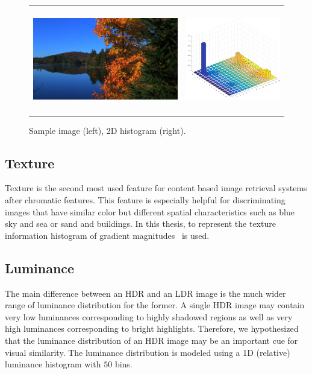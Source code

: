\begin{figure}
\centering
\begin{tabular}{c c}
\includegraphics[height=1.8in]{figures/chapter2/MasonLake.jpg} &
\includegraphics[height=1.8in]{figures/chapter2/57_histab.png}
\end{tabular}
\caption{Sample image (left), 2D histogram (right).}
\label{fig:hists}
\end{figure}

\subsection{Texture}
Texture is the second most used feature for content based image retrieval systems after chromatic features. This feature is especially helpful for discriminating images that have similar color but different spatial characteristics such as blue sky and sea or sand and buildings. In this thesis, to represent the texture information histogram of gradient magnitudes~\cite{sharma2015histogram} is used. 
\subsection{Luminance}
The main difference between an HDR and an LDR image is the much wider range of luminance distribution for the former. A single HDR image may contain very low luminances corresponding to highly shadowed regions as well as very high luminances corresponding to bright highlights. Therefore, we hypothesized that the luminance distribution of an HDR image may be an important cue for visual similarity. The luminance distribution is modeled using a 1D (relative) luminance histogram with $50$ bins.
